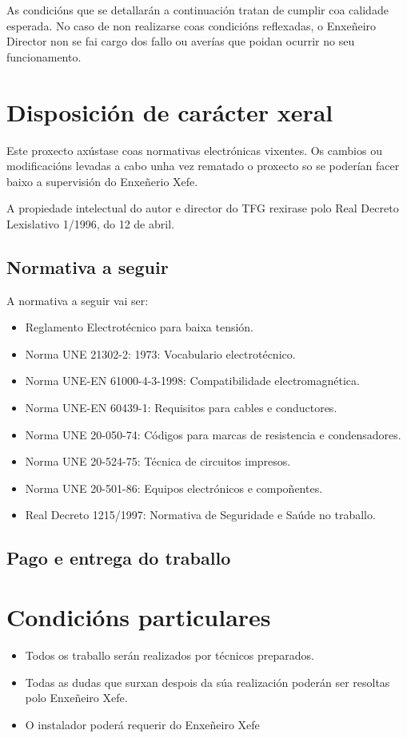 \documentclass[11pt,twoside]{book}
\begin{document}
As condicións que se detallarán a continuación tratan de cumplir coa calidade esperada. No caso de non realizarse coas condicións reflexadas, o Enxeñeiro Director non se fai cargo dos fallo ou averías que poidan ocurrir no seu funcionamento.


\chapter{Disposición de carácter xeral}

Este proxecto axústase coas normativas electrónicas vixentes. Os cambios ou modificacións levadas a cabo unha vez rematado o proxecto so se poderían facer baixo a supervisión do Enxeñerio Xefe.

A propiedade intelectual do autor e director do TFG rexirase polo Real Decreto Lexislativo 1/1996, do 12 de abril.

\section{Normativa a seguir}
A normativa a seguir vai ser:
\begin{itemize}
    \item Reglamento Electrotécnico para baixa tensión.
    \item Norma UNE 21302-2: 1973: Vocabulario electrotécnico.
    \item Norma UNE-EN 61000-4-3-1998: Compatibilidade electromagnética.
    \item Norma UNE-EN 60439-1: Requisitos para cables e conductores.
    \item Norma UNE 20-050-74: Códigos para marcas de resistencia e condensadores.
    \item Norma UNE 20-524-75: Técnica de circuitos impresos.
    \item Norma UNE 20-501-86: Equipos electrónicos e compoñentes.
    \item Real Decreto 1215/1997: Normativa de Seguridade e Saúde no traballo.
\end{itemize}

\section{Pago e entrega do traballo}
\chapter{Condicións particulares}

\begin{itemize}
    \item Todos os traballo serán realizados por técnicos preparados.
    \item Todas as dudas que surxan despois da súa realización poderán ser resoltas polo Enxeñeiro Xefe.
    \item O instalador poderá requerir do Enxeñeiro Xefe 
\end{itemize}
\end{document}
